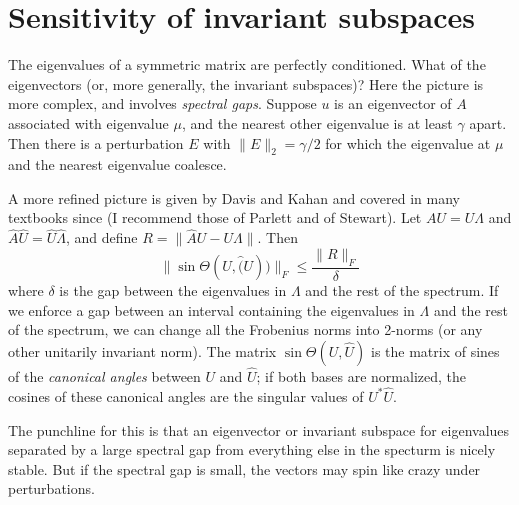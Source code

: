 \section{Sensitivity of invariant subspaces}

The eigenvalues of a symmetric matrix are perfectly conditioned.  What
of the eigenvectors (or, more generally, the invariant subspaces)?
Here the picture is more complex, and involves {\em spectral gaps}.
Suppose $u$ is an eigenvector of $A$ associated with eigenvalue $\mu$,
and the nearest other eigenvalue is at least $\gamma$ apart.  Then
there is a perturbation $E$ with $\|E\|_2 = \gamma/2$ for which the
eigenvalue at $\mu$ and the nearest eigenvalue coalesce.

A more refined picture is given by Davis and Kahan and covered in many
textbooks since (I recommend those of Parlett and of Stewart).  Let
$AU = U\Lambda$ and $\hat{A} \hat{U} = \hat{U} \hat{\Lambda}$,
and define $R = \|\hat{A} U-U \Lambda\|$.  Then
\[
  \|\sin \Theta(U,\hat(U))\|_F \leq \frac{\|R\|_F}{\delta}
\]
where $\delta$ is the gap between the eigenvalues in $\Lambda$
and the rest of the spectrum.  If we enforce a gap between an interval
containing the eigenvalues in $\Lambda$ and the rest of the spectrum,
we can change all the Frobenius norms into 2-norms (or any other
unitarily invariant norm).  The matrix $\sin \Theta(U,\hat{U})$ is
the matrix of sines of the {\em canonical angles} between $U$ and $\hat{U}$;
if both bases are normalized, the cosines of these canonical angles are
the singular values of $U^* \hat{U}$.

The punchline for this is that an eigenvector or invariant subspace
for eigenvalues separated by a large spectral gap from everything
else in the specturm is nicely stable.  But if the spectral gap is small,
the vectors may spin like crazy under perturbations.
